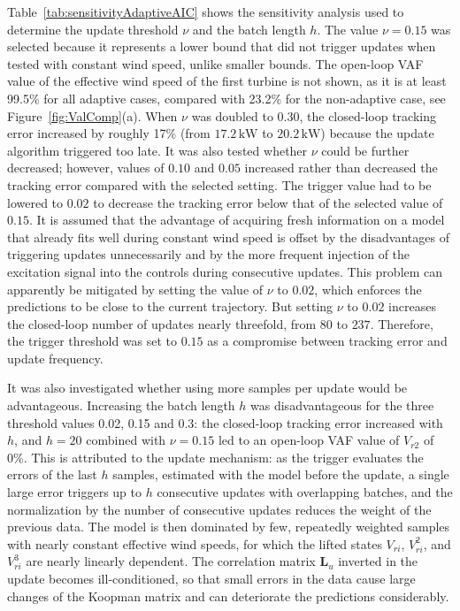 Table~\ref{tab:sensitivityAdaptiveAIC} shows the sensitivity analysis used to determine the update threshold $\nu$ and the batch length $h$. The value $\nu = 0.15$ was selected because it represents a lower bound that did not trigger updates when tested with constant wind speed, unlike smaller bounds. The open-loop VAF value of the effective wind speed of the first turbine is not shown, as it is at least 99.5\% for all adaptive cases, compared with 23.2\% for the non-adaptive case, see Figure~\ref{fig:ValComp}(a). When $\nu$ was doubled to $0.30$, the closed-loop tracking error increased by roughly 17\% (from $17.2\,\mathrm{kW}$ to $20.2\,\mathrm{kW}$) because the update algorithm triggered too late. It was also tested whether $\nu$ could be further decreased; however, values of $0.10$ and $0.05$ increased rather than decreased the tracking error compared with the selected setting. The trigger value had to be lowered to $0.02$ to decrease the tracking error below that of the selected value of $0.15$. It is assumed that the advantage of acquiring fresh information on a model that already fits well during constant wind speed is offset by the disadvantages of triggering updates unnecessarily and by the more frequent injection of the excitation signal into the controls during consecutive updates. This problem can apparently be mitigated by setting the value of $\nu$ to $0.02$, which enforces the predictions to be close to the current trajectory. But setting $\nu$ to $0.02$ increases the closed-loop number of updates nearly threefold, from $80$ to $237$. Therefore, the trigger threshold was set to $0.15$ as a compromise between tracking error and update frequency.

It was also investigated whether using more samples per update would be advantageous. Increasing the batch length $h$ was disadvantageous for the three threshold values 0.02, 0.15 and 0.3: the closed-loop tracking error increased with $h$, and $h = 20$ combined with $\nu = 0.15$ led to an open-loop VAF value of $V_{r2}$ of 0\%. This is attributed to the update mechanism: as the trigger evaluates the errors of the last $h$ samples, estimated with the model before the update, a single large error triggers up to $h$ consecutive updates with overlapping batches, and the normalization by the number of consecutive updates reduces the weight of the previous data. The model is then dominated by few, repeatedly weighted samples with nearly constant effective wind speeds, for which the lifted states $V_{ri}$, $V_{ri}^2$, and $V_{ri}^3$ are nearly linearly dependent. The correlation matrix $\mathbf{L}_u$ inverted in the update becomes ill-conditioned, so that small errors in the data cause large changes of the Koopman matrix and can deteriorate the predictions considerably.

